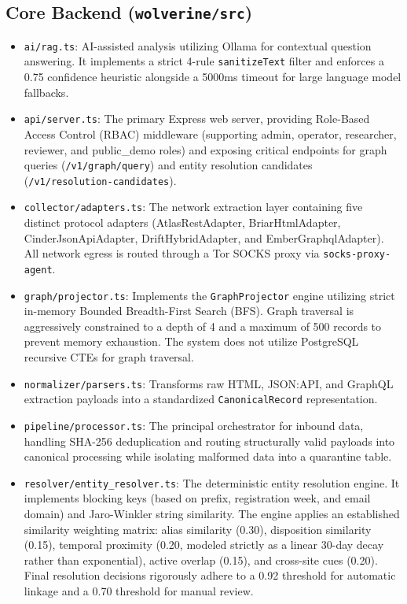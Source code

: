 \subsection{Core Backend (\texttt{wolverine/src})}
\begin{itemize}
    \item \texttt{ai/rag.ts}: AI-assisted analysis utilizing Ollama for contextual question answering. It implements a strict 4-rule \texttt{sanitizeText} filter and enforces a 0.75 confidence heuristic alongside a 5000ms timeout for large language model fallbacks.
    \item \texttt{api/server.ts}: The primary Express web server, providing Role-Based Access Control (RBAC) middleware (supporting admin, operator, researcher, reviewer, and public\_demo roles) and exposing critical endpoints for graph queries (\texttt{/v1/graph/query}) and entity resolution candidates (\texttt{/v1/resolution-candidates}).
    \item \texttt{collector/adapters.ts}: The network extraction layer containing five distinct protocol adapters (AtlasRestAdapter, BriarHtmlAdapter, CinderJsonApiAdapter, DriftHybridAdapter, and EmberGraphqlAdapter). All network egress is routed through a Tor SOCKS proxy via \texttt{socks-proxy-agent}.
    \item \texttt{graph/projector.ts}: Implements the \texttt{GraphProjector} engine utilizing strict in-memory Bounded Breadth-First Search (BFS). Graph traversal is aggressively constrained to a depth of 4 and a maximum of 500 records to prevent memory exhaustion. The system does not utilize PostgreSQL recursive CTEs for graph traversal.
    \item \texttt{normalizer/parsers.ts}: Transforms raw HTML, JSON:API, and GraphQL extraction payloads into a standardized \texttt{CanonicalRecord} representation.
    \item \texttt{pipeline/processor.ts}: The principal orchestrator for inbound data, handling SHA-256 deduplication and routing structurally valid payloads into canonical processing while isolating malformed data into a quarantine table.
    \item \texttt{resolver/entity\_resolver.ts}: The deterministic entity resolution engine. It implements blocking keys (based on prefix, registration week, and email domain) and Jaro-Winkler string similarity. The engine applies an established similarity weighting matrix: alias similarity (0.30), disposition similarity (0.15), temporal proximity (0.20, modeled strictly as a linear 30-day decay rather than exponential), active overlap (0.15), and cross-site cues (0.20). Final resolution decisions rigorously adhere to a 0.92 threshold for automatic linkage and a 0.70 threshold for manual review.
\end{itemize}

